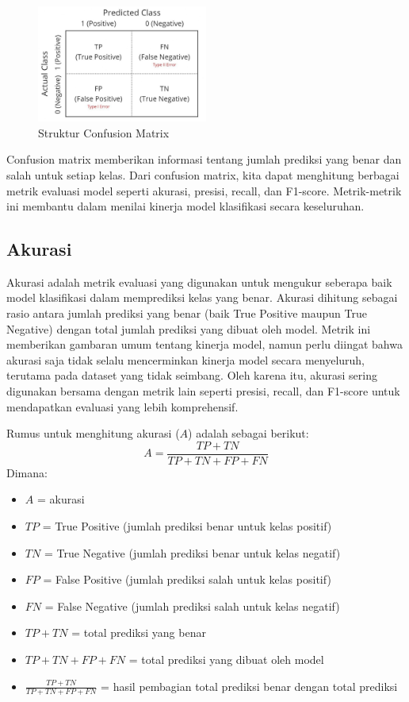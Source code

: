 \begin{figure}[H]
    \centering
    \includegraphics[width=0.5\textwidth]{Gambar/conf.jpg}
    \caption{Struktur Confusion Matrix}
    \label{fig:confusion-matrix}
\end{figure}

Confusion matrix memberikan informasi tentang jumlah prediksi yang benar dan salah untuk setiap kelas. Dari confusion matrix, kita dapat menghitung berbagai metrik evaluasi model seperti akurasi, presisi, recall, dan F1-score. Metrik-metrik ini membantu dalam menilai kinerja model klasifikasi secara keseluruhan.

\subsection{Akurasi}
Akurasi adalah metrik evaluasi yang digunakan untuk mengukur seberapa baik model klasifikasi dalam memprediksi kelas yang benar. Akurasi dihitung sebagai rasio antara jumlah prediksi yang benar (baik True Positive maupun True Negative) dengan total jumlah prediksi yang dibuat oleh model. Metrik ini memberikan gambaran umum tentang kinerja model, namun perlu diingat bahwa akurasi saja tidak selalu mencerminkan kinerja model secara menyeluruh, terutama pada dataset yang tidak seimbang. Oleh karena itu, akurasi sering digunakan bersama dengan metrik lain seperti presisi, recall, dan F1-score untuk mendapatkan evaluasi yang lebih komprehensif. \parencite{jain2016feature}

Rumus untuk menghitung akurasi ($A$) adalah sebagai berikut:
\begin{equation}
    A = \frac{TP + TN}{TP + TN + FP + FN}
\end{equation}
Dimana:
\begin{itemize}
    \item $A$ = akurasi
    \item $TP$ = True Positive (jumlah prediksi benar untuk kelas positif)
    \item $TN$ = True Negative (jumlah prediksi benar untuk kelas negatif)
    \item $FP$ = False Positive (jumlah prediksi salah untuk kelas positif)
    \item $FN$ = False Negative (jumlah prediksi salah untuk kelas negatif)
    \item $TP + TN$ = total prediksi yang benar
    \item $TP + TN + FP + FN$ = total prediksi yang dibuat oleh model
    \item $\frac{TP + TN}{TP + TN + FP + FN}$ = hasil pembagian total prediksi benar dengan total prediksi
\end{itemize}

